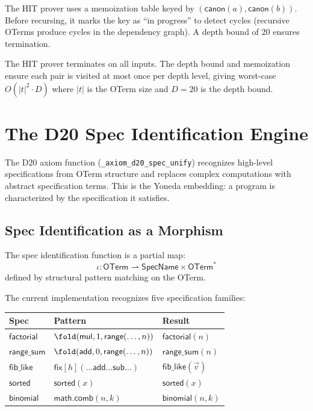 The HIT prover uses a memoization table keyed by
$(\mathsf{canon}(a), \mathsf{canon}(b))$.  Before recursing,
it marks the key as ``in progress'' to detect cycles (recursive
OTerms produce cycles in the dependency graph).  A depth bound
of 20 ensures termination.

\begin{proposition}
The HIT prover terminates on all inputs.  The depth bound and
memoization ensure each pair is visited at most once per depth
level, giving worst-case $O(|t|^2 \cdot D)$ where $|t|$ is
the OTerm size and $D = 20$ is the depth bound.
\end{proposition}


\section{The D20 Spec Identification Engine}
\label{sec:d20-formal}

The D20 axiom function (\texttt{\_axiom\_d20\_spec\_unify})
recognizes high-level specifications from OTerm structure and
replaces complex computations with abstract specification terms.
This is the Yoneda embedding: a program is characterized by
the specification it satisfies.

\subsection{Spec Identification as a Morphism}

\begin{definition}
\label{def:spec-id}
The spec identification function is a partial map:
\[
  \iota : \mathsf{OTerm} \rightharpoonup
  \mathsf{SpecName} \times \mathsf{OTerm}^*
\]
defined by structural pattern matching on the OTerm.
\end{definition}

The current implementation recognizes five specification families:

\begin{center}
\begin{tabular}{lp{6cm}l}
\hline
\textbf{Spec} & \textbf{Pattern} & \textbf{Result} \\
\hline
$\mathsf{factorial}$ &
  $\fold(\mathsf{mul}, 1, \mathsf{range}(\ldots, n))$ &
  $\mathsf{factorial}(n)$ \\
$\mathsf{range\_sum}$ &
  $\fold(\mathsf{add}, 0, \mathsf{range}(\ldots, n))$ &
  $\mathsf{range\_sum}(n)$ \\
$\mathsf{fib\_like}$ &
  $\mathsf{fix}[h](\ldots\mathsf{add}\ldots\mathsf{sub}\ldots)$ &
  $\mathsf{fib\_like}(\vec{v})$ \\
$\mathsf{sorted}$ &
  $\mathsf{sorted}(x)$ &
  $\mathsf{sorted}(x)$ \\
$\mathsf{binomial}$ &
  $\mathsf{math.comb}(n,k)$ &
  $\mathsf{binomial}(n,k)$ \\
\hline
\end{tabular}
\end{center}

